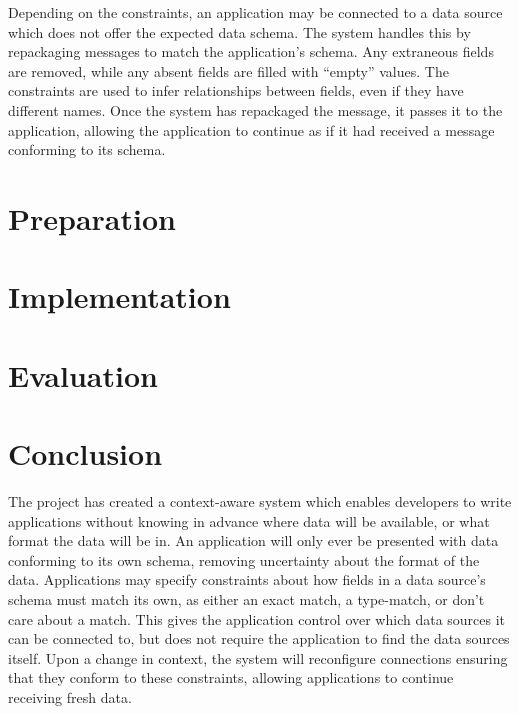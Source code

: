 \documentclass[12pt,twoside,notitlepage]{report}
\begin{document}
Depending on the constraints, an application may be connected to a data source which does not offer the expected data schema. 
The system handles this by repackaging messages to match the application's schema. Any extraneous fields are removed, while any absent fields are filled with ``empty'' values. The constraints are used to infer relationships between fields, even if they have different names. 
Once the system has repackaged the message, it passes it to the application, allowing the application to continue as if it had received a message conforming to its schema.

\cleardoublepage

 
\chapter{Preparation}


\cleardoublepage


\chapter{Implementation}


\cleardoublepage


\chapter{Evaluation}


\cleardoublepage

\chapter{Conclusion}

The project has created a context-aware system which enables developers to write applications without knowing in advance where data will be available, or what format the data will be in.
An application will only ever be presented with data conforming to its own schema, removing uncertainty about the format of the data. 
Applications may specify constraints about how fields in a data source's schema must match its own, as either an exact match, a type-match, or don't care about a match.
This gives the application control over which data sources it can be connected to, but does not require the application to find the data sources itself. 
Upon a change in context, the system will reconfigure connections ensuring that they conform to these constraints, allowing applications to continue receiving fresh data.
\end{document}
